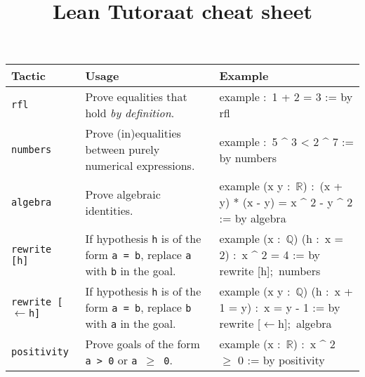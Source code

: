 \documentclass[10pt,landscape]{article}
\title{Lean Tutoraat cheat sheet}
\author{}
\date{}
\begin{document}
\maketitle

\begin{table}[h!]
\centering
\begin{tabularx}{\textwidth}{l p{10cm} X}
\toprule
\textbf{\!Tactic} & \textbf{\!Usage} & \textbf{\!Example} \\
\midrule

\texttt{rfl} & 
Prove equalities that hold \emph{by definition}. &
\parbox{8cm}{\ttfamily\small
example :\ 1 + 2 = 3 := by rfl
} \\

\midrule

\texttt{numbers} & 
Prove (in)equalities between purely numerical expressions. &
\parbox{12cm}{\ttfamily\small
example :\ 5 \^{} 3 < 2 \^{} 7 := by numbers
} \\

\midrule

\texttt{algebra} & 
Prove algebraic identities. &
\parbox{12cm}{\ttfamily\small
example (x y :\ $\mathbb{R}$) :\ (x + y) * (x - y) = x \^{} 2 - y \^{} 2 := by algebra
} \\ 

\midrule

\texttt{rewrite [h]} & 
If hypothesis \texttt{h} is of the form \texttt{a = b}, replace \texttt{a} with \texttt{b} in the goal. &
\parbox{12cm}{\ttfamily\small
example (x :\ $\mathbb{Q}$) (h :\ x = 2) :\ x \^{} 2 = 4 := by\\
\hspace*{1em}rewrite [h];\ numbers
} \\ 

\midrule

\texttt{rewrite [$\leftarrow$h]} & 
If hypothesis \texttt{h} is of the form \texttt{a = b}, replace \texttt{b} with \texttt{a} in the goal. &
\parbox{12cm}{\ttfamily\small
example (x y :\ $\mathbb{Q}$) (h :\ x + 1 = y) :\ x = y - 1 := by\\
\hspace*{1em}rewrite [$\leftarrow$h];\ algebra
} \\ 

\midrule

\texttt{positivity} & 
Prove goals of the form \texttt{a > 0} or \texttt{a $\geq$ 0}. &
\parbox{12cm}{\ttfamily\small
example (x :\ $\mathbb{R}$) :\ x \^{} 2 $\geq$ 0 := by positivity
} \\ 


\end{tabularx}
\end{table}
\end{document}
